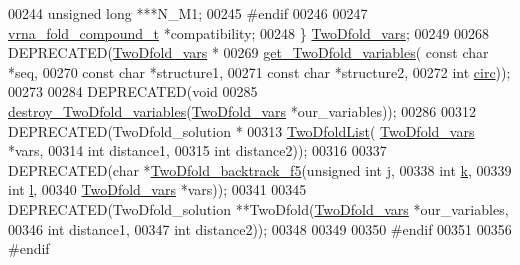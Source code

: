 \begin{DoxyCode}
00244   \textcolor{keywordtype}{unsigned} \textcolor{keywordtype}{long}             ***N\_M1;
00245 \textcolor{preprocessor}{#endif}
00246 
00247   \hyperlink{group__fold__compound_structvrna__fc__s}{vrna\_fold\_compound\_t} *compatibility;
00248 \} \hyperlink{group__kl__neighborhood__mfe_gaf4f514010a14f9d59d850742b3e96954}{TwoDfold\_vars};
00249 
00268 DEPRECATED(\hyperlink{group__kl__neighborhood__mfe_structTwoDfold__vars}{TwoDfold\_vars} *
00269 \hyperlink{group__kl__neighborhood__mfe_gac9284f132cf0eaa0a2f43590eda05488}{get\_TwoDfold\_variables}( \textcolor{keyword}{const} \textcolor{keywordtype}{char} *seq,
00270                         \textcolor{keyword}{const} \textcolor{keywordtype}{char} *structure1,
00271                         \textcolor{keyword}{const} \textcolor{keywordtype}{char} *structure2,
00272                         \textcolor{keywordtype}{int} \hyperlink{group__model__details_gaf9202a1a09f5828dc731e2d9a10fa111}{circ}));
00273 
00284 DEPRECATED(\textcolor{keywordtype}{void} 
00285 \hyperlink{group__kl__neighborhood__mfe_ga05bf4f31d216b1b160fd2d3d68e9b487}{destroy\_TwoDfold\_variables}(\hyperlink{group__kl__neighborhood__mfe_structTwoDfold__vars}{TwoDfold\_vars} *our\_variables));
00286 
00312 DEPRECATED(TwoDfold\_solution *
00313 \hyperlink{group__kl__neighborhood__mfe_ga7fc5e3e92fe97914ca4eccd33c01c2a7}{TwoDfoldList}( \hyperlink{group__kl__neighborhood__mfe_structTwoDfold__vars}{TwoDfold\_vars} *vars,
00314               \textcolor{keywordtype}{int} distance1,
00315               \textcolor{keywordtype}{int} distance2));
00316 
00337 DEPRECATED(\textcolor{keywordtype}{char} *\hyperlink{group__kl__neighborhood__mfe_gaf4dc05bf8fc1ea53acd7aeb798ba80c2}{TwoDfold\_backtrack\_f5}(\textcolor{keywordtype}{unsigned} \textcolor{keywordtype}{int} j,
00338                             \textcolor{keywordtype}{int} \hyperlink{group__kl__neighborhood__mfe_ac111e850bb3b3a11b6b5707912cfa1b8}{k},
00339                             \textcolor{keywordtype}{int} \hyperlink{group__kl__neighborhood__mfe_ab8e95cd920901175a2cc8de726ab1d36}{l},
00340                             \hyperlink{group__kl__neighborhood__mfe_structTwoDfold__vars}{TwoDfold\_vars} *vars));
00341 
00345 DEPRECATED(TwoDfold\_solution **TwoDfold(\hyperlink{group__kl__neighborhood__mfe_structTwoDfold__vars}{TwoDfold\_vars} *our\_variables,
00346                                         \textcolor{keywordtype}{int} distance1,
00347                                         \textcolor{keywordtype}{int} distance2));
00348 
00349 
00350 \textcolor{preprocessor}{#endif}
00351 
00356 \textcolor{preprocessor}{#endif}
\end{DoxyCode}
